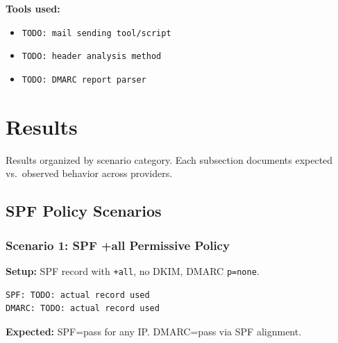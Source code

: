 \documentclass[11pt,a4paper]{article}
\begin{document}
\noindent\textbf{Tools used:}
\begin{itemize}[noitemsep]
    \item \texttt{TODO: mail sending tool/script}
    \item \texttt{TODO: header analysis method}
    \item \texttt{TODO: DMARC report parser}
\end{itemize}

\section{Results}

Results organized by scenario category. Each subsection documents expected vs.\ observed behavior across providers.

\subsection{SPF Policy Scenarios}

\subsubsection{Scenario 1: SPF +all Permissive Policy}

\textbf{Setup:} SPF record with \texttt{+all}, no DKIM, DMARC \texttt{p=none}.

\begin{lstlisting}
SPF: TODO: actual record used
DMARC: TODO: actual record used
\end{lstlisting}

\textbf{Expected:} SPF=pass for any IP. DMARC=pass via SPF alignment.
\end{document}
